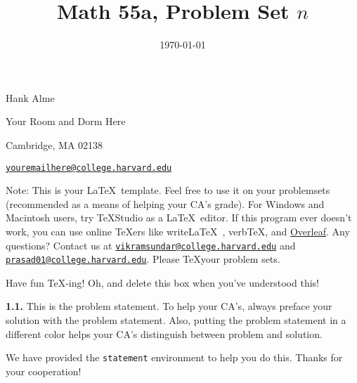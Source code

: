 \documentclass[12pt]{amsart}
\title{Math 55a, Problem Set $n$} %
\date{\today}
\newenvironment{statement}[1]{\smallskip\noindent\color[rgb]{1.00,0.00,0.50} {\bf #1.}}{}
\theoremstyle{definition}
\theoremstyle{remark}
\begin{document}
\maketitle

\vspace*{-0.25in}
\centerline{Hank Alme}
\centerline{Your Room and Dorm Here}
\centerline{Cambridge, MA 02138}
\centerline{\href{mailto:youremailhere@college.harvard.edu}{{\tt youremailhere@college.harvard.edu}}}
\vspace*{0.15in}

\begin{framed}
  Note: This is your \LaTeX~template. Feel free to use it on your problemsets (recommended as a means of helping your CA's grade). For Windows and Macintosh users, try {\TeX}Studio as a \LaTeX~editor. If this program ever doesn't work, you can use online {\TeX}ers like write\LaTeX~, verb\TeX, and \href{http://www.overleaf.com}{Overleaf}. Any questions? Contact us at \href{mailto:vikramsundar@college.harvard.edu}{{\tt vikramsundar@college.harvard.edu}} and \href{mailto:prasad01@college.harvard.edu}{{\tt prasad01@college.harvard.edu}}. Please \TeX your problem sets.

    Have fun \TeX-ing! Oh, and delete this box when you've understood this!
\end{framed}

\begin{statement}{1.1}
    This is the problem statement. To help your CA's, always preface your solution with the problem statement. Also, putting the problem statement in a different color helps your CA's distinguish between problem and solution. 

    We have provided the {\tt statement} environment to help you do this. Thanks for your cooperation!
\end{statement}
\end{document}
